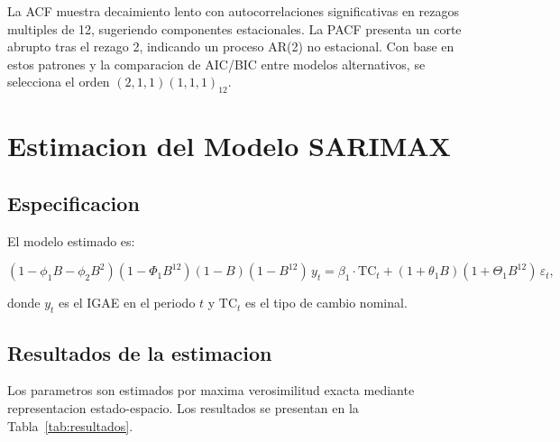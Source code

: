 \documentclass[12pt,a4paper]{article}
\begin{document}
La ACF muestra decaimiento lento con autocorrelaciones significativas en rezagos multiples de 12, sugeriendo componentes estacionales. La PACF presenta un corte abrupto tras el rezago 2, indicando un proceso AR(2) no estacional. Con base en estos patrones y la comparacion de AIC/BIC entre modelos alternativos, se selecciona el orden $(2,1,1)(1,1,1)_{12}$.

\section{Estimacion del Modelo SARIMAX}

\subsection{Especificacion}

El modelo estimado es:

\begin{equation}
  (1 - \phi_1 B - \phi_2 B^2)(1-\Phi_1 B^{12})(1-B)(1-B^{12})\,y_t
  = \beta_1\cdot\text{TC}_t + (1+\theta_1 B)(1+\Theta_1 B^{12})\,\varepsilon_t,
\end{equation}

donde $y_t$ es el IGAE en el periodo $t$ y $\text{TC}_t$ es el tipo de cambio nominal.

\subsection{Resultados de la estimacion}

Los parametros son estimados por maxima verosimilitud exacta mediante representacion estado-espacio. Los resultados se presentan en la Tabla~\ref{tab:resultados}.
\end{document}
